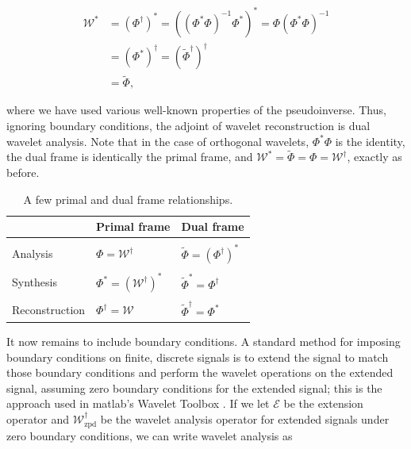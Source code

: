 \documentclass[journal]{IEEEtran}
\begin{document}
\begin{align*}
   \mathcal{W}^\ast &= \left(\Phi^\dagger\right)^\ast = \left(\left(\Phi^\ast\Phi\right)^{-1}\Phi^\ast\right)^\ast = \Phi\left(\Phi^\ast\Phi\right)^{-1}\\ 
                    &= \left(\Phi^\ast\right)^\dagger = \left(\tilde{\Phi}^\dagger\right)^\dagger\\
                    &= \tilde{\Phi},
\end{align*}

\noindent where we have used various well-known properties of the pseudoinverse.  Thus, ignoring boundary conditions, the adjoint of wavelet reconstruction is dual wavelet analysis.  Note that in the case of orthogonal wavelets, $\Phi^\ast\Phi$ is the identity, the dual frame is identically the primal frame, and ${\mathcal{W}^\ast = \tilde{\Phi}=\Phi=\mathcal{W}^\dagger}$, exactly as before.\\

\begin{table}[ht]
   \centering
   \caption{A few primal and dual frame relationships.}%
   \label{tab:wave_relations}
   \begin{tabular}{lll}
      &Primal frame&Dual frame\\\hline\\[-0.5em]
      Analysis & $\Phi = \mathcal{W}^\dagger$ & $\tilde{\Phi}=\left(\Phi^\dagger\right)^\ast$\\\\[-0.5em]
      Synthesis & $\Phi^\ast = \left(\mathcal{W}^\dagger\right)^\ast$ & $\tilde{\Phi}^\ast = \Phi^\dagger$ \\\\[-0.5em]
      Reconstruction & $\Phi^\dagger = \mathcal{W}$ & $\tilde{\Phi}^\dagger = \Phi^\ast$
   \end{tabular}
\end{table}

It now remains to include boundary conditions.  A standard method for imposing boundary conditions on finite, discrete signals is to extend the signal to match those boundary conditions and perform the wavelet operations on the extended signal, assuming zero boundary conditions for the extended signal; this is the approach used in {\sc matlab}'s Wavelet Toolbox \cite{matlab_wt_2015}.  If we let $\mathcal{E}$ be the extension operator and $\mathcal{W}^\dagger_\text{zpd}$ be the wavelet analysis operator for extended signals under zero boundary conditions, we can write wavelet analysis as 
\end{document}
